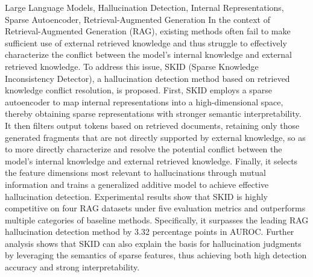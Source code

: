 \begin{englishabstract}{Large Language Models, Hallucination Detection, Internal Representations, Sparse Autoencoder, Retrieval-Augmented Generation}
In the context of Retrieval-Augmented Generation (RAG), existing methods often fail to make sufficient use of external retrieved knowledge and thus struggle to effectively characterize the conflict between the model's internal knowledge and external retrieved knowledge. To address this issue, SKID (Sparse Knowledge Inconsistency Detector), a hallucination detection method based on retrieved knowledge conflict resolution, is proposed. First, SKID employs a sparse autoencoder to map internal representations into a high-dimensional space, thereby obtaining sparse representations with stronger semantic interpretability. It then filters output tokens based on retrieved documents, retaining only those generated fragments that are not directly supported by external knowledge, so as to more directly characterize and resolve the potential conflict between the model's internal knowledge and external retrieved knowledge. Finally, it selects the feature dimensions most relevant to hallucinations through mutual information and trains a generalized additive model to achieve effective hallucination detection. Experimental results show that SKID is highly competitive on four RAG datasets under five evaluation metrics and outperforms multiple categories of baseline methods. Specifically, it surpasses the leading RAG hallucination detection method by 3.32 percentage points in AUROC. Further analysis shows that SKID can also explain the basis for hallucination judgments by leveraging the semantics of sparse features, thus achieving both high detection accuracy and strong interpretability.

\end{englishabstract}
